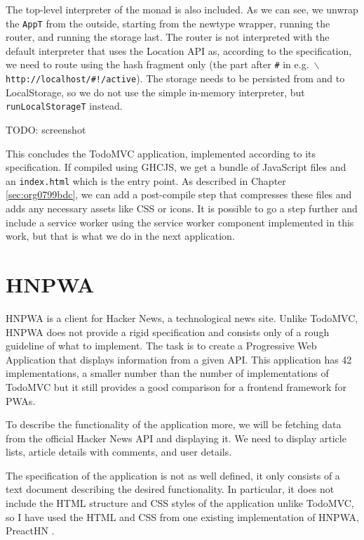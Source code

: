 \documentclass[english,odsaz]{fitthesis}
\begin{document}
The top-level interpreter of the monad is also included. As we can see, we
unwrap the \texttt{AppT} from the outside, starting from the newtype wrapper, running the
router, and running the storage last. The router is not interpreted with the
default interpreter that uses the Location API as, according to the
specification, we need to route using the hash fragment only (the part after \texttt{\#}
in e.g.~$\backslash$ \texttt{http://localhost/\#!/active}). The storage needs to be persisted
from and to LocalStorage, so we do not use the simple in-memory interpreter, but
\texttt{runLocalStorageT} instead.

TODO: screenshot

This concludes the TodoMVC application, implemented according to its
specification. If compiled using GHCJS, we get a bundle of JavaScript files and
an \texttt{index.html} which is the entry point. As described in Chapter \ref{sec:org0799bdc}, we
can add a post-compile step that compresses these files and adds any necessary
assets like CSS or icons. It is possible to go a step further and include a
service worker using the service worker component implemented in this work, but
that is what we do in the next application.

\section{HNPWA}
\label{sec:org9047238}
HNPWA \cite{hnpwa} is a client for Hacker News, a technological news site. Unlike
TodoMVC, HNPWA does not provide a rigid specification and consists only of a
rough guideline of what to implement. The task is to create a Progressive Web
Application that displays information from a given API. This application has 42
implementations, a smaller number than the number of implementations of TodoMVC
but it still provides a good comparison for a frontend framework for PWAs.

To describe the functionality of the application more, we will be fetching data
from the official Hacker News API and displaying it. We need to display article
lists, article details with comments, and user details.

The specification of the application is not as well defined, it only consists of
a text document describing the desired functionality. In particular, it does not
include the HTML structure and CSS styles of the application unlike TodoMVC, so
I have used the HTML and CSS from one existing implementation of HNPWA, PreactHN
\cite{preacthn}.
\end{document}
